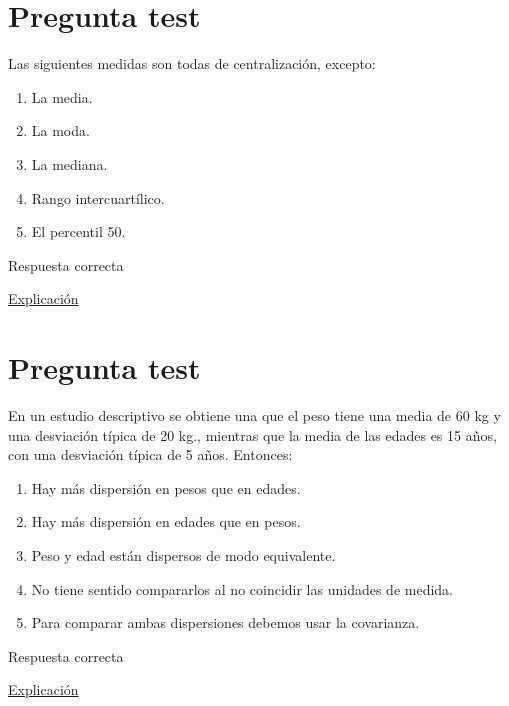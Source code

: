\documentclass[
]{book}
\providecommand{\tightlist}{%
  \setlength{\itemsep}{0pt}\setlength{\parskip}{0pt}}
\begin{document}
\hypertarget{pregunta-test-63}{%
\section{Pregunta test}\label{pregunta-test-63}}

Las siguientes medidas son todas de centralización, excepto:

\begin{enumerate}
\def\labelenumi{\alph{enumi})}
\tightlist
\item
  La media.
\item
  La moda.
\item
  La mediana.
\item
  Rango intercuartílico.
\item
  El percentil 50.
\end{enumerate}

Respuesta correcta

\href{https://1fjmanzano.github.io/bioestadistica/medidas-de-posicio\%CC\%81n-dispersio\%CC\%81n-y-forma.html\#medidas-de-posicio\%CC\%81n-centrales}{Explicación}

\hypertarget{pregunta-test-64}{%
\section{Pregunta test}\label{pregunta-test-64}}

En un estudio descriptivo se obtiene una que el peso tiene una media de 60 kg y una desviación típica de 20 kg., mientras que la media de las edades es 15 años, con una desviación típica de 5 años. Entonces:

\begin{enumerate}
\def\labelenumi{\alph{enumi})}
\tightlist
\item
  Hay más dispersión en pesos que en edades.
\item
  Hay más dispersión en edades que en pesos.
\item
  Peso y edad están dispersos de modo equivalente.
\item
  No tiene sentido compararlos al no coincidir las unidades de medida.
\item
  Para comparar ambas dispersiones debemos usar la covarianza.
\end{enumerate}

Respuesta correcta

\href{https://1fjmanzano.github.io/bioestadistica/medidas-de-posicio\%CC\%81n-dispersio\%CC\%81n-y-forma.html}{Explicación}
\end{document}
